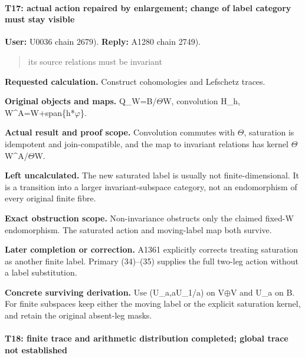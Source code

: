 \paragraph{T17: actual action repaired by enlargement; change of label
category must stay
visible}\label{t17-actual-action-repaired-by-enlargement-change-of-label-category-must-stay-visible}

\textbf{User:} U0036
\protect{} chain 2679).
\textbf{Reply:} A1280
\protect{} chain 2749).

\begin{quote}
its source relations must be invariant
\end{quote}

\textbf{Requested calculation.} Construct cohomologies and Lefschetz
traces.

\textbf{Original objects and maps.}
Q\_W=B/\allowbreak{}\ensuremath{Θ}\allowbreak{}W, convolution H\_h,
W\textasciicircum{}A=W+span\{h*\allowbreak{}\ensuremath{φ}\allowbreak{}\}.

\textbf{Actual result and proof scope.} Convolution commutes with
\allowbreak{}\ensuremath{Θ}\allowbreak{}, saturation is idempotent and
join-compatible, and the map to invariant relations has kernel
\allowbreak{}\ensuremath{Θ}\allowbreak{}W\textasciicircum{}A/\allowbreak{}\ensuremath{Θ}\allowbreak{}W.

\textbf{Left uncalculated.} The new saturated label is usually not
finite-dimensional. It is a transition into a larger invariant-subspace
category, not an endomorphism of every original finite fibre.

\textbf{Exact obstruction scope.} Non-invariance obstructs only the
claimed fixed-W endomorphism. The saturated action and moving-label map
both survive.

\textbf{Later completion or correction.} A1361 explicitly corrects
treating saturation as another finite label. Primary (34)--(35) supplies
the full two-leg action without a label substitution.

\textbf{Concrete surviving derivation.} Use (U\_a,aU\_1/a) on
V\allowbreak{}\ensuremath{⊕}\allowbreak{}V and U\_a on B. For finite
subspaces keep either the moving label or the explicit saturation
kernel, and retain the original absent-leg masks.

\paragraph{T18: finite trace and arithmetic distribution completed;
global trace not
established}\label{t18-finite-trace-and-arithmetic-distribution-completed-global-trace-not-established}

